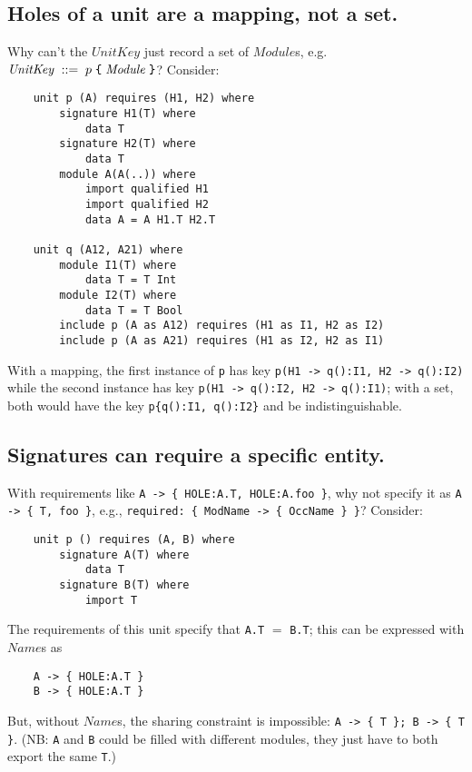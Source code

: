 \documentclass{article}
\newcommand{\I}[1]{\ensuremath{\mathit{#1}}}
\begin{document}
\subsection{Holes of a unit are a mapping, not a set.}

Why can't the \I{UnitKey} just record a
set of \I{Module}s, e.g. $\I{UnitKey}\;::= \; p \; \verb|{| \; \I{Module} \; \verb|}|$?  Consider:

\begin{verbatim}
    unit p (A) requires (H1, H2) where
        signature H1(T) where
            data T
        signature H2(T) where
            data T
        module A(A(..)) where
            import qualified H1
            import qualified H2
            data A = A H1.T H2.T

    unit q (A12, A21) where
        module I1(T) where
            data T = T Int
        module I2(T) where
            data T = T Bool
        include p (A as A12) requires (H1 as I1, H2 as I2)
        include p (A as A21) requires (H1 as I2, H2 as I1)
\end{verbatim}
With a mapping, the first instance of \verb|p| has key \verb|p(H1 -> q():I1, H2 -> q():I2)|
while the second instance has key \verb|p(H1 -> q():I2, H2 -> q():I1)|; with
a set, both would have the key \verb|p{q():I1, q():I2}| and be
indistinguishable.

\subsection{Signatures can require a specific entity.}
With requirements like \verb|A -> { HOLE:A.T, HOLE:A.foo }|,
why not specify it as \verb|A -> { T, foo }|,
e.g., \verb|required: { ModName -> { OccName } }|?  Consider:

\begin{verbatim}
    unit p () requires (A, B) where
        signature A(T) where
            data T
        signature B(T) where
            import T
\end{verbatim}
The requirements of this unit specify that \verb|A.T| $=$ \verb|B.T|; this
can be expressed with \I{Name}s as

\begin{verbatim}
    A -> { HOLE:A.T }
    B -> { HOLE:A.T }
\end{verbatim}
But, without \I{Name}s, the sharing constraint is impossible:  \verb|A -> { T }; B -> { T }|. (NB: \verb|A| and \verb|B| could be filled with different modules, they just have
to both export the same \verb|T|.)
\end{document}
